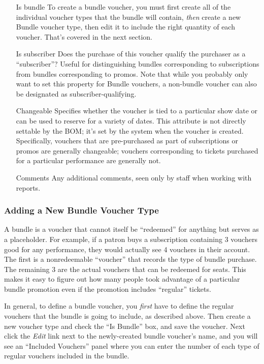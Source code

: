 \begin{itemize}
\item[Is bundle] To create a bundle voucher, you must first create all
  of the individual voucher types that the bundle will contain,
  \emph{then} create a new Bundle voucher type, then edit it to include
  the right quantity of each voucher.  That's covered in the next section.
\item[Is subscriber] Does the purchase of this voucher qualify the
  purchaser as a ``subscriber''?  Useful for distinguishing bundles
  corresponding to subscriptions from bundles corresponding to promos.
  Note that while you probably only want to set this property for Bundle
  vouchers, a non-bundle voucher can also be designated as
  subscriber-qualifying. 
\item[Changeable] Specifies whether the voucher is tied to a particular
  show date or can be used to reserve for a variety of dates. This
  attribute is not directly settable by the BOM; it's set by the system
  when the voucher is created.  Specifically, vouchers that are
  pre-purchased as part of subscriptions or promos are generally
  changeable; vouchers corresponding to tickets purchased for a
  particular performance are generally not.
\item[Comments] Any additional comments, seen only by staff when working
  with reports.
\end{itemize}


\subsubsection{Adding a New Bundle Voucher Type}
\label{sec:addingbundlevouchertypes}


A bundle is a voucher that cannot itself be ``redeemed'' for anything
but serves as a placeholder.  For example, if a patron buys a
subscription containing 3 vouchers good for any performance, they would
actually see 4 vouchers in their account.  The first is a nonredeemable
``voucher'' that records the type of bundle purchase.  The remaining 3
are the actual vouchers that can be redeemed for seats.  This makes it
easy to figure out how many people took advantage of a particular
bundle promotion even if the promotion includes ``regular'' tickets.

In general, to define a bundle voucher, you \emph{first} have to define the
regular vouchers that the bundle is going to include, as described
above.   Then create a new voucher type and check the ``Is Bundle'' box,
and save the voucher.  Next click the \emph{Edit} link next to the
newly-created bundle voucher's name, and you will see an ``Included
Vouchers''  panel where you can enter the
number of each type of regular vouchers included in the bundle.

